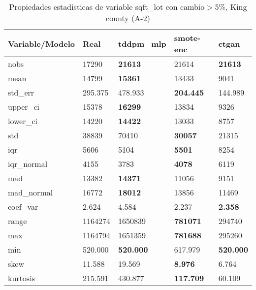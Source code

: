 \begin{table}[H]
\centering
\fontsize{8}{14}\selectfont
\caption{Propiedades estadisticas de variable sqft\_lot con cambio\ensuremath{>}5\%, King county (A-2)}
\label{table-stats-king county-a-2-sqft_lot-short}
\begin{tabular}{|l|m{10em}|m{10em}|m{10em}|m{10em}|}
\hline
 \rowcolor[gray]{0.8}
Variable/Modelo & Real & tddpm\_mlp & smote-enc & ctgan \\
\hline nobs & 17290 & \bfseries 21613 & \cellcolor[rgb]{0.9, 0.54, 0.52} 21614 & \bfseries 21613 \\
\hline mean & 14799 & \bfseries 15361 & 13433 & \cellcolor[rgb]{0.9, 0.54, 0.52} 9041 \\
\hline std\_err & 295.375 & \cellcolor[rgb]{0.9, 0.54, 0.52} 478.933 & \bfseries 204.445 & 144.989 \\
\hline upper\_ci & 15378 & \bfseries 16299 & 13834 & \cellcolor[rgb]{0.9, 0.54, 0.52} 9326 \\
\hline lower\_ci & 14220 & \bfseries 14422 & 13033 & \cellcolor[rgb]{0.9, 0.54, 0.52} 8757 \\
\hline std & 38839 & \cellcolor[rgb]{0.9, 0.54, 0.52} 70410 & \bfseries 30057 & 21315 \\
\hline iqr & 5606 & 5104 & \bfseries 5501 & \cellcolor[rgb]{0.9, 0.54, 0.52} 8254 \\
\hline iqr\_normal & 4155 & 3783 & \bfseries 4078 & \cellcolor[rgb]{0.9, 0.54, 0.52} 6119 \\
\hline mad & 13382 & \bfseries 14371 & 11056 & \cellcolor[rgb]{0.9, 0.54, 0.52} 9151 \\
\hline mad\_normal & 16772 & \bfseries 18012 & 13856 & \cellcolor[rgb]{0.9, 0.54, 0.52} 11469 \\
\hline coef\_var & 2.624 & \cellcolor[rgb]{0.9, 0.54, 0.52} 4.584 & 2.237 & \bfseries 2.358 \\
\hline range & 1164274 & 1650839 & \bfseries 781071 & \cellcolor[rgb]{0.9, 0.54, 0.52} 294740 \\
\hline max & 1164794 & 1651359 & \bfseries 781688 & \cellcolor[rgb]{0.9, 0.54, 0.52} 295260 \\
\hline min & 520.000 & \bfseries 520.000 & \cellcolor[rgb]{0.9, 0.54, 0.52} 617.979 & \bfseries 520.000 \\
\hline skew & 11.588 & \cellcolor[rgb]{0.9, 0.54, 0.52} 19.569 & \bfseries 8.976 & 6.764 \\
\hline kurtosis & 215.591 & \cellcolor[rgb]{0.9, 0.54, 0.52} 430.877 & \bfseries 117.709 & 60.109 \\

\end{tabular}
\end{table}
